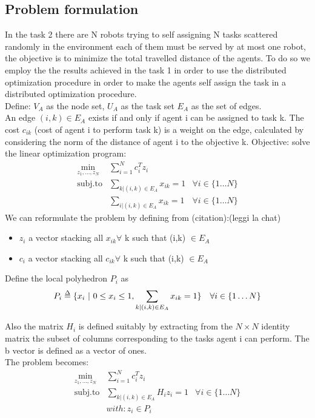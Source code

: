 \documentclass{article}
\def\delequal{\mathrel{\ensurestackMath{\stackon[1pt]{=}{\scriptstyle\Delta}}}}
\begin{document}
\subsection{Problem formulation}
In the task 2 there are N robots trying to self assigning N tasks scattered randomly in the environment each of them must be served by at most one robot, the objective is to minimize the total travelled distance of the agents. To do so we employ the the results achieved in the task 1 in order to use the distributed optimization procedure in order to make the agents self assign the task in a distributed optimization procedure.\\
Define: $V_A$ as the node set, $U_A$ as the task set $E_A$ as the set of edges.
\\
An edge $(i,k) \in E_A$ exists if and only if agent i can be assigned to task k.
The cost $c_{ik}$ (cost of agent i to perform task k) is a weight on the edge, calculated by considering the norm of the distance of agent i to the objective k.
Objective: solve the linear optimization program:
\begin{align}
    \min_{z_1,...,z_N}  &\sum_{i=1}^{N} c_i^Tz_i \\
    \text{subj.to}      &\sum_{k|(i,k)\in E_A} x_{ik} =1 
  & \forall i \in \{1\dots N\}
    \\
   & \sum_{i|(i,k)\in E_A} x_{ik} =1   & \forall i \in \{1\dots N\}
\end{align}
We can reformulate the problem by defining from (citation):(leggi la chat)
\begin{itemize}
\item $z_i$ a vector stacking all $x_{ik} \forall$  k such that (i,k) $\in E_A$
\item $c_i$ a vector stacking all $c_{ik} \forall$  k such that (i,k) $\in E_A$
\end{itemize}
Define the local polyhedron $P_i$ as
\begin{align}
    P_i &\delequal \{x_i \ | \ 0 \leq x_i \leq 1, \sum_{k|(i,k)\in E_A} x_{ik} =1\} & \forall i \in \{1\dots N\}
\end{align}

Also the matrix ${H_i}$ is defined suitably by extracting from the  ${N\times N}$  identity matrix the subset of columns corresponding to the tasks agent i can perform. The b vector is defined as a vector of ones.\\
The problem becomes:\\
\begin{align}
    \min_{z_1,...,z_N} & \sum_{i=1}^{N} c_i^Tz_i \\
    \text{subj.to} & \sum_{k|(i,k)\in E_A} H_iz_i =1 & \forall i \in \{1\dots N\}
    \\
   & with: z_i \in P_i
\end{align}
\end{document}

